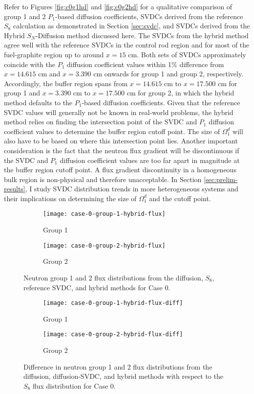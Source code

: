 Refer to Figures \ref{fig:c0g1hd} and \ref{fig:c0g2hd} for a qualitative comparison of group 1 and
2 $P_1$-based diffusion coefficients, \glspl{SVDC} derived from the reference $S_8$ calculation as
demonstrated in Section \ref{sec:svdc}, and \glspl{SVDC} derived from the Hybrid $S_N$-Diffusion
method discussed here. The \glspl{SVDC} from the hybrid method agree well with the reference
\glspl{SVDC} in the control rod region and for most of the fuel-graphite region up to around
$x=15$ cm. Both sets of \glspl{SVDC} approximately coincide with the $P_1$ diffusion coefficient
values within 1\% difference from $x=14.615$ cm and $x=3.390$ cm onwards for group 1 and
group 2, respectively. Accordingly, the buffer region spans from $x=14.615$ cm to $x=17.500$ cm for
group 1 and $x=3.390$ cm to $x=17.500$ cm for group 2, in which the hybrid method defaults to the
$P_1$-based diffusion coefficients. Given that the reference \gls{SVDC} values will generally not
be known in real-world problems, the hybrid method relies on finding the intersection point of the
\gls{SVDC} and $P_1$ diffusion coefficient values to determine the buffer region cutoff point. The
size of $\Omega^d_1$ will also have to be based on where this intersection point lies.
Another important consideration is the fact that the neutron flux gradient will be discontinuous if
the \gls{SVDC} and $P_1$ diffusion coefficient values are too far apart in magnitude at the buffer
region cutoff point. A flux gradient discontinuity in a homogeneous bulk region is non-physical and
therefore unacceptable. In Section \ref{sec:prelim-results}, I study \gls{SVDC} distribution trends
in more heterogeneous systems and their implications on determining the size of $\Omega^d_1$ and
the cutoff point.
%
\begin{figure}[htb!]
  \centering
  \begin{subfigure}[b]{.49\textwidth}
    \centering
    \texttt{[image: case-0-group-1-hybrid-flux]}
    \caption{Group 1}
    \label{fig:c0g1hf}
  \end{subfigure}
  \hfill
  \begin{subfigure}[b]{.49\textwidth}
    \centering
    \texttt{[image: case-0-group-2-hybrid-flux]}
    \caption{Group 2}
    \label{fig:c0g2hf}
  \end{subfigure}
  \caption{Neutron group 1 and 2 flux distributions from the diffusion, $S_8$, reference
  \gls{SVDC}, and hybrid methods for Case 0.}
  \label{fig:c0hf}
  \centering
  \begin{subfigure}[b]{.49\textwidth}
    \centering
    \texttt{[image: case-0-group-1-hybrid-flux-diff]}
    \caption{Group 1}
    \label{fig:c0g1hfdiff}
  \end{subfigure}
  \hfill
  \begin{subfigure}[b]{.49\textwidth}
    \centering
    \texttt{[image: case-0-group-2-hybrid-flux-diff]}
    \caption{Group 2}
    \label{fig:c0g2hfdiff}
  \end{subfigure}
  \caption{Difference in neutron group 1 and 2 flux distributions from the diffusion,
  diffusion-\gls{SVDC}, and hybrid methods with respect to the $S_8$ flux distribution for Case 0.}
  \label{fig:c0hfdiff}
\end{figure}

